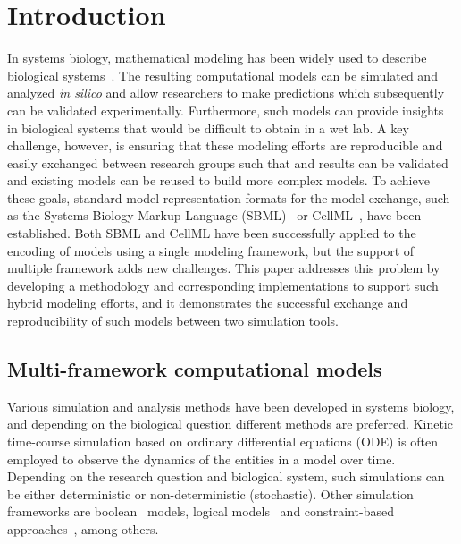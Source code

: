 \documentclass{bioinfo}
\begin{document}

\section{Introduction}
In systems biology, mathematical modeling has been widely used to describe biological systems~\citep{COMPBIO}. The resulting computational models can be simulated and analyzed \emph{in silico} and allow researchers to make predictions which subsequently can be validated experimentally. Furthermore, such models can provide insights in biological systems that would be difficult to obtain in a wet lab. A key challenge, however, is ensuring that these modeling efforts are reproducible and easily exchanged between research groups such that and results can be validated and existing models can be reused to build more complex models. To achieve these goals, standard model representation formats for the model exchange, such as the Systems Biology Markup Language (SBML)~\citep{SBML} or CellML~\citep{CELLML}, have been established. Both SBML and CellML have been successfully applied to the encoding of models using a single modeling framework, but the support of multiple framework adds new challenges. This paper addresses this problem by developing a methodology and corresponding implementations to support such hybrid modeling efforts, and it demonstrates the successful exchange and reproducibility of such models between two simulation tools.

\subsection{Multi-framework computational models}
Various simulation and analysis methods have been developed in systems biology, and depending on the biological question different methods are preferred. Kinetic time-course simulation based on ordinary differential equations (ODE) is often employed to observe the dynamics of the entities in a model over time. Depending on the research question and biological system, such simulations can be either deterministic or non-deterministic (stochastic). Other simulation frameworks are boolean~\citep{boolean1,boolean2} models, logical models~\citep{logicSignaling} and constraint-based approaches~\citep{constraintModels}, among others.
\end{document}
